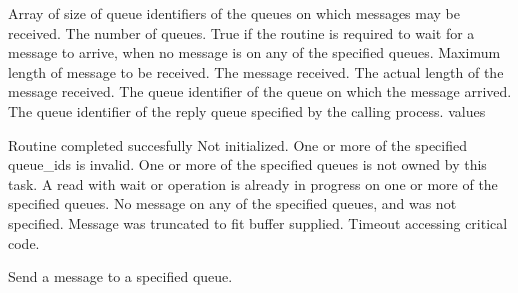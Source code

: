 \begin{appendix}
\begin{manroutinedescription}
\begin{manparametertable}
 Array of size %
{}
                         of queue identifiers of the queues on which
                         messages may be received.
                         The number of queues.
                         True if the routine is required to wait
                         for a message to arrive, when no message
                         is on any of the specified queues.
                         Maximum length of message to be received.
                         The message received.
                         The actual length of the message received.
                         The queue identifier of the queue on which
                         the message arrived.
                         The queue identifier of the reply queue
                         specified by the calling process.
      {} values
\end{manparametertable}
\begin{mantwocolumntable}
  Routine completed succesfully
  {} Not initialized.
  One or more of the specified %
queue\_ids
                             is invalid.
  One or more of the specified %
queues is
                             not owned by this task.
  A read with wait or {} operation
                             is already in progress on one or more
                             of the specified queues.
 No message on any of the %
specified
                             queues, and {} was not specified.
 Message was truncated to fit %
buffer supplied.
 Timeout accessing critical code.
\end{mantwocolumntable}
\end{manroutinedescription}
\begin{manroutinedescription}
      Send a message to a specified queue.


\end{manroutinedescription}
\end{appendix}
